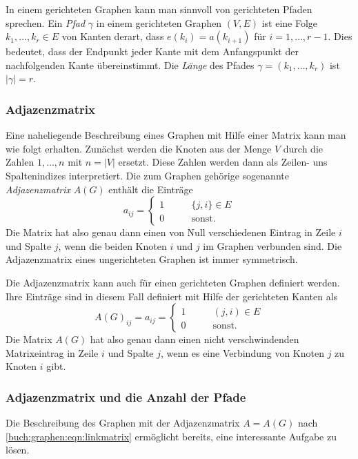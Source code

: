 In einem gerichteten Graphen kann man sinnvoll von gerichteten Pfaden
sprechen.
%
Ein {\em Pfad} $\gamma$ in einem gerichteten Graphen $(V,E)$ ist eine Folge
$k_1,\dots,k_r\in E$ von Kanten derart, dass $e(k_i) = a(k_{i+1})$
für $i=1,\dots,r-1$.
Dies bedeutet, dass der Endpunkt jeder Kante mit dem Anfangspunkt der
nachfolgenden Kante übereinstimmt.
Die {\em Länge} des Pfades $\gamma=(k_1,\dots,k_r)$ ist $|\gamma|=r$.

\subsubsection{Adjazenzmatrix}
Eine naheliegende Beschreibung eines Graphen mit Hilfe einer
Matrix kann man wie folgt erhalten.
Zunächst werden die Knoten aus der Menge $V$ durch die Zahlen
$1,\dots,n$ mit $n=|V|$ ersetzt.
Diese Zahlen werden dann als Zeilen- uns Spaltenindizes interpretiert.
Die zum Graphen gehörige sogenannte {\em Adjazenzmatrix} $A(G)$
enthält die Einträge
\begin{equation}
a_{ij}
=
\begin{cases}
1&\qquad  \{j,i\} \in E\\
0&\qquad  \text{sonst.}
\end{cases}
\label{buch:graphen:eqn:linkmatrix}
\end{equation}
Die Matrix hat also genau dann einen von Null verschiedenen Eintrag
in Zeile $i$ und Spalte $j$, wenn die beiden Knoten $i$ und $j$
im Graphen verbunden sind.
Die Adjazenzmatrix eines ungerichteten Graphen ist immer symmetrisch.

Die Adjazenzmatrix kann auch für einen gerichteten Graphen definiert
werden.
Ihre Einträge sind in diesem Fall definiert mit Hilfe der 
gerichteten Kanten als
\begin{equation}
A(G)_{ij}
=
a_{ij}
=
\begin{cases}
1&\qquad  (j,i) \in E\\
0&\qquad  \text{sonst.}
\end{cases}
\label{buch:graphen:eqn:linkmatrix}
\end{equation}
Die Matrix $A(G)$ hat also genau dann einen nicht verschwindenden
Matrixeintrag in Zeile $i$ und Spalte $j$, wenn es eine Verbindung
von Knoten $j$ zu Knoten $i$ gibt.


\subsubsection{Adjazenzmatrix und die Anzahl der Pfade}
Die Beschreibung des Graphen mit der Adjazenzmatrix $A=A(G)$ nach
\eqref{buch:graphen:eqn:linkmatrix} ermöglicht bereits, eine interessante
Aufgabe zu lösen.

